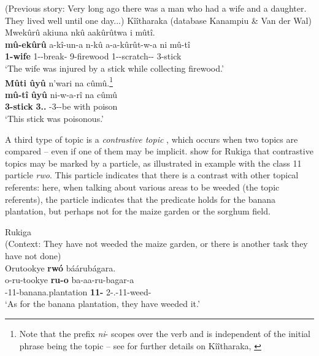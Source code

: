 \documentclass[output=paper]{langscibook}
\begin{document}
\ea
(Previous story: Very long ago there was a man who had a wife and a daughter. They lived well until one day...)
\label{bkm:Ref122686153}
Kîîtharaka (database Kanampiu \& Van der Wal)\\
Mwekûrû akiuna nkû aakûrûtwa i mûtî.\\
\gll
\textbf{mû-ekûrû}  a-kî-un-a  n-kû  a-a-kûrût-w-a  ni  mû-tî\\
\textbf{1-wife}  1\SM-\DEP{}-break-\FV{}  9-firewood  1\SM-\PST{}-scratch-\PASS-\FV{}  \FOC{}  3-stick\\
\glt
‘The wife was injured by a stick while collecting firewood.’\\

\sn
\textbf{Mûti ûyû} n'wari na cûmû.\footnote{Note that the prefix \textit{ni}\nobreakdash- scopes over the verb and is independent of the initial phrase being the topic -- see for further details  on Kîîtharaka, \cite{chapters/kiitharaka}}\\
\gll
\textbf{mû-tî}  \textbf{ûyû}  ni-w-a-rî  na  cûmû\\
\textbf{3-stick}  \textbf{3.\DEM.\PROX{}}  \FOC{}-3\SM{}-\PST{}-be  with  poison\\
\glt
‘This stick was poisonous.’\\


\z

A third type of topic is a \textit{contrastive topic} \citep{Büring2016,Repp2010,Vermeulen2012}, which occurs when two topics are compared – even if one of them may be implicit. \citet{AsiimwevanderWal2021} show for Rukiga that contrastive topics may be marked by a particle, as illustrated in example  with the class 11 particle \textit{rwo}. This particle indicates that there is a contrast with other topical referents: here, when talking about various areas to be weeded (the topic referents), the particle indicates that the predicate holds for the banana plantation, but perhaps not for the maize garden or the sorghum field.

\ea
\label{bkm:Ref122686235}
Rukiga \citep[11]{AsiimwevanderWal2021}\\
(Context: They have not weeded the maize garden, or there is another task they have not done)\\
 Orutookye \textbf{rwó} báárubágara.\\
\gll
  o-ru-tookye  \textbf{ru-o}  ba-aa-ru-bagar-a\\
\AUG{}-11-banana.plantation  \textbf{11-\CM{}}  2\SM-\N.\PST{}-11\OM{}-weed{}-\FV{}\\
\glt ‘As for the banana plantation, they have weeded it.’\\
\end{document}
